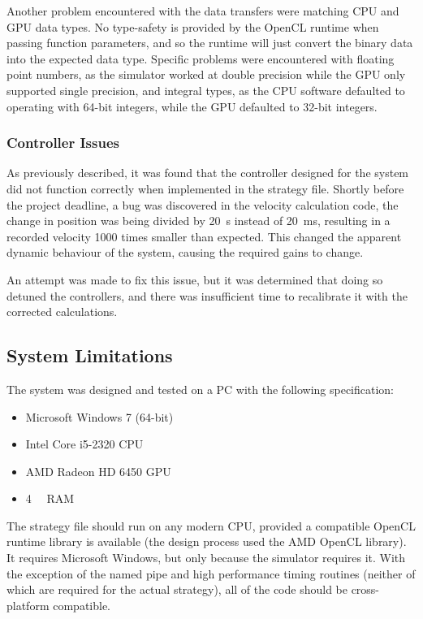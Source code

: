 \documentclass[10pt]{article}
\begin{document}
Another problem encountered with the data transfers were matching CPU and GPU
data types.  No type-safety is provided by the OpenCL runtime when passing
function parameters, and so the runtime will just convert the binary data into
the expected data type.  Specific problems were encountered with floating point
numbers, as the simulator worked at double precision while the GPU only
supported single precision, and integral types, as the CPU software defaulted to
operating with 64-bit integers, while the GPU defaulted to 32-bit integers.

\subsubsection{Controller Issues}

As previously described, it was found that the controller designed for the
system did not function correctly when implemented in the strategy file. 
Shortly before the project deadline, a bug was discovered in the velocity
calculation code, the change in position was being divided by \SI{20}{\second}
instead of \SI{20}{\milli\second}, resulting in a recorded velocity 1000 times
smaller than expected.  This changed the apparent dynamic behaviour of the
system, causing the required gains to change.

An attempt was made to fix this issue, but it was determined that doing so
detuned the controllers, and there was insufficient time to recalibrate it with
the corrected calculations.

\subsection{System Limitations}

The system was designed and tested on a PC with the following specification:

\begin{itemize}
 \item Microsoft Windows 7 (64-bit)
 \item Intel Core i5-2320 CPU
 \item AMD Radeon HD 6450 GPU
 \item \SI{4}{\giga\byte} RAM
\end{itemize}

The strategy file should run on any modern CPU, provided a compatible OpenCL
runtime library is available (the design process used the AMD OpenCL library). 
It requires Microsoft Windows, but only because the simulator requires it. With
the exception of the named pipe and high performance timing routines (neither
of which are required for the actual strategy), all of the code should be
cross-platform compatible.
\end{document}
